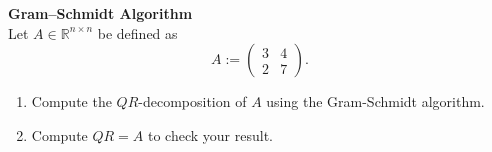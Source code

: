 \textbf{Gram--Schmidt Algorithm}\\
Let $A \in \mathbb{R}^{n \times n}$ be defined as 
$$
	A := \begin{pmatrix}
		3&4\\
		2&7
	\end{pmatrix}.
$$ 
\begin{enumerate}
	\item Compute the $QR$-decomposition of $A$ using the Gram-Schmidt algorithm.
	\item Compute $QR= A$ to check your result.
\end{enumerate}
